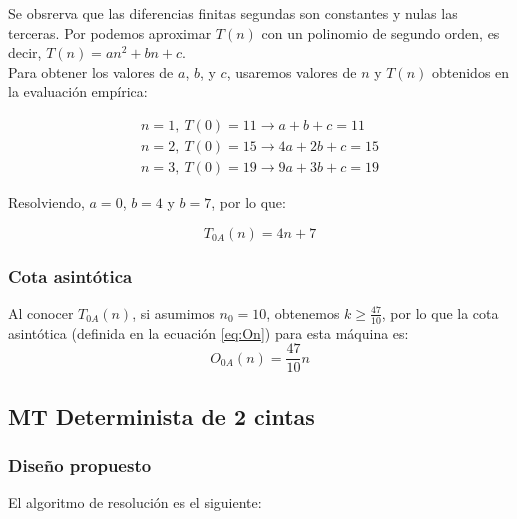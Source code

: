 Se obsrerva que las diferencias finitas segundas son constantes y nulas las terceras. Por podemos aproximar $T(n)$ con un polinomio de segundo orden, es decir, $T(n) = an^2 + bn + c$.\\

Para obtener los valores de $a$, $b$, y $c$, usaremos valores de $n$ y $T(n)$ obtenidos en la evaluación empírica:

\begin{subequations}
    \begin{gather}
        n = 1,\ T(0) = 11 \rightarrow a + b + c = 11 \\
        n = 2,\ T(0) = 15 \rightarrow 4a + 2b + c = 15 \\
        n = 3,\ T(0) = 19 \rightarrow 9a + 3b + c = 19
    \end{gather}
\end{subequations}

Resolviendo, $a=0$, $b=4$ y $b=7$, por lo que:

\begin{equation}
    T_{0A}(n) = 4n + 7
\end{equation}

\subsubsection*{Cota asintótica}
Al conocer $T_{0A}(n)$, si asumimos $n_0 = 10$, obtenemos $k \geq \frac{47}{10}$, por lo que la cota asintótica (definida en la ecuación \ref{eq:On}) para esta máquina es:
\begin{equation}
    O_{0A}(n) = \frac{47}{10} n
\end{equation}



\subsection{MT Determinista de 2 cintas}

\subsubsection*{Diseño propuesto}
El algoritmo de resolución es el siguiente:

